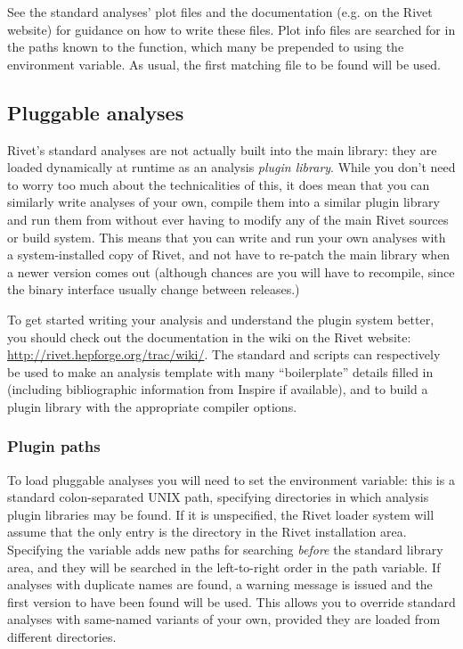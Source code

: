 See the standard analyses' plot files and the  documentation
(e.g. on the Rivet website) for guidance on how to write these files. Plot info
files are searched for in the paths known to the
 function, which many be prepended to using
the  environment variable. As usual, the first matching
file to be found will be used.



\subsection{Pluggable analyses}

Rivet's standard analyses are not actually built into the main 
library: they are loaded dynamically at runtime as an analysis \emph{plugin
  library}. While you don't need to worry too much about the technicalities of
this, it does mean that you can similarly write analyses of your own, compile
them into a similar plugin library and run them from  without ever
having to modify any of the main Rivet sources or build system. This means that
you can write and run your own analyses with a system-installed copy of Rivet,
and not have to re-patch the main library when a newer version comes out
(although chances are you will have to recompile, since the binary interface usually
change between releases.)

To get started writing your analysis and understand the plugin system better,
you should check out the documentation in the wiki on the Rivet website:
\url{http://rivet.hepforge.org/trac/wiki/}. The standard
 and  scripts can respectively be
used to make an analysis template with many ``boilerplate'' details filled in
(including bibliographic information from Inspire if available), and to build a
plugin library with the appropriate compiler options.


\subsubsection{Plugin paths}

To load pluggable analyses you will need to set the 
environment variable: this is a standard colon-separated UNIX path, specifying
directories in which analysis plugin libraries may be found. If it is
unspecified, the Rivet loader system will assume that the only entry is the
 directory in the Rivet installation area. Specifying the variable adds
new paths for searching \emph{before} the standard library area, and they will
be searched in the left-to-right order in the path variable. If analyses with
duplicate names are found, a warning message is issued and the first version to
have been found will be used. This allows you to override standard analyses
with same-named variants of your own, provided they are loaded from different
directories.

